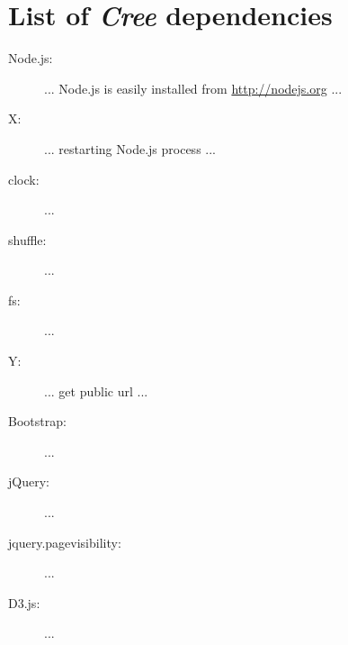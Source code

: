 \documentclass[preprint, 12pt]{elsarticle}
\newcommand{\Cree}{\emph{Cree}\xspace}
\begin{document}
\newpage

\appendix

\section{List of \Cree dependencies}

\begin{description}
  \item[Node.js:] ... Node.js is easily installed from \url{http://nodejs.org} ...
  \item[{\color{red} X:}] ... restarting Node.js process ...
  \item[clock:] ...
  \item[shuffle:] ...
  \item[fs:] ...
  \item[{\color{red} Y:}] ... get public url ...
  \item[Bootstrap:] ...
  \item[jQuery:] ...
  \item[{\color{red} jquery.pagevisibility:}] ...
  \item[D3.js:] ...
\end{description}

\newpage


\raggedright
\singlespacing

\end{document}
